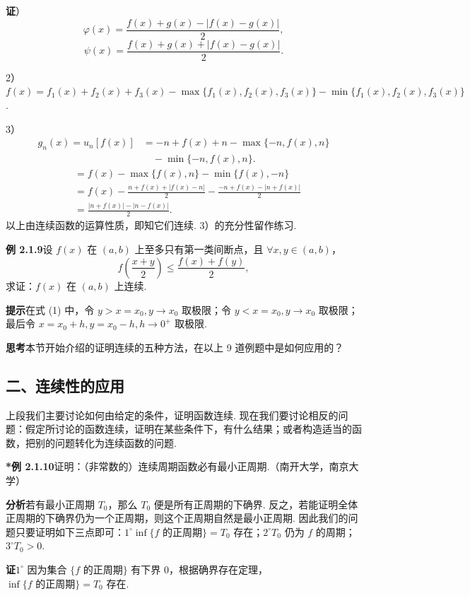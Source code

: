 \documentclass[UTF8, 12pt, fontset=fandol, oneside]{ctexart}
\begin{document}
\noindent\textbf{证}）
\[
  \varphi(x)=\frac{f(x)+g(x)-|f(x)-g(x)|}{2},
\]
\[
  \psi(x)=\frac{f(x)+g(x)+|f(x)-g(x)|}{2}.
\]

2）$f(x)=f_1(x)+f_2(x)+f_3(x)-\max\{f_1(x),f_2(x),f_3(x)\}-\min\{f_1(x),f_2(x),f_3(x)\}$.

3）
\[
\begin{aligned}
g_n(x)=u_n[f(x)]
&=-n+f(x)+n-\max\{-n,f(x),n\}\\
&\quad-\min\{-n,f(x),n\}.
\end{aligned}
\]
\[
\begin{aligned}
&=f(x)-\max\{f(x),n\}-\min\{f(x),-n\}\\
&=f(x)-\frac{n+f(x)+|f(x)-n|}{2}
  -\frac{-n+f(x)-|n+f(x)|}{2}\\
&=\frac{|n+f(x)|-|n-f(x)|}{2}.
\end{aligned}
\]
以上由连续函数的运算性质，即知它们连续. 3）的充分性留作练习.

\noindent\textbf{例 2.1.9}\quad 设 $f(x)$ 在 $(a,b)$ 上至多只有第一类间断点，且 $\forall x,y\in(a,b)$，
\[
  f\left(\frac{x+y}{2}\right)\le \frac{f(x)+f(y)}{2},
\tag{1}
\]
求证：$f(x)$ 在 $(a,b)$ 上连续.

\noindent\textbf{提示}\quad 在式 (1) 中，令 $y>x=x_0,y\to x_0$ 取极限；令 $y<x=x_0,y\to x_0$ 取极限；最后令 $x=x_0+h,y=x_0-h,h\to0^+$ 取极限.

\noindent\textbf{思考}\quad 本节开始介绍的证明连续的五种方法，在以上 9 道例题中是如何应用的？

\subsection*{二、连续性的应用}

上段我们主要讨论如何由给定的条件，证明函数连续. 现在我们要讨论相反的问题：假定所讨论的函数连续，证明在某些条件下，有什么结果；或者构造适当的函数，把别的问题转化为连续函数的问题.

\noindent\textbf{*例 2.1.10}\quad 证明：（非常数的）连续周期函数必有最小正周期.（南开大学，南京大学）

\noindent\textbf{分析}\quad 若有最小正周期 $T_0$，那么 $T_0$ 便是所有正周期的下确界. 反之，若能证明全体正周期的下确界仍为一个正周期，则这个正周期自然是最小正周期. 因此我们的问题只要证明如下三点即可：$1^\circ\inf\{f\text{ 的正周期}\}=T_0$ 存在；$2^\circ T_0$ 仍为 $f$ 的周期；$3^\circ T_0>0$.

\noindent\textbf{证}\quad $1^\circ$ 因为集合 $\{f\text{ 的正周期}\}$ 有下界 $0$，根据确界存在定理，$\inf\{f\text{ 的正周期}\}=T_0$ 存在.
\end{document}
